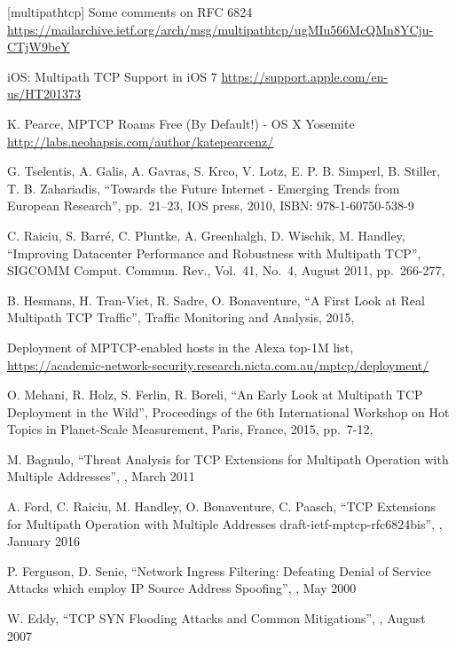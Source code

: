 \begin{thebibliography}{99}
[multipathtcp] Some comments on RFC 6824
\url{https://mailarchive.ietf.org/arch/msg/multipathtcp/ugMIu566McQMn8YCju-CTjW9beY}

iOS: Multipath TCP Support in iOS 7
\url{https://support.apple.com/en-us/HT201373}

K. Pearce, MPTCP Roams Free (By Default!) - OS X Yosemite
\url{http://labs.neohapsis.com/author/katepearcenz/}

G. Tselentis, A. Galis, A. Gavras, S. Krco, V. Lotz, E. P. B. Simperl, B. Stiller, T. B. Zahariadis, 
``Towards the Future Internet - Emerging Trends from European Research'',
pp.\ 21--23,
IOS press, 2010,
ISBN: 978-1-60750-538-9

C. Raiciu, S. Barr{\'e}, C. Pluntke, A. Greenhalgh, D. Wischik, M. Handley,
``Improving Datacenter Performance and Robustness with Multipath TCP'', 
SIGCOMM Comput. Commun. Rev., 
Vol.\ 41, No.\ 4,
August 2011, 
pp.\ 266-277,

B. Hesmans, H. Tran-Viet, R. Sadre, O. Bonaventure, 
``A First Look at Real Multipath TCP Traffic'',
Traffic Monitoring and Analysis,
2015,

Deployment of MPTCP-enabled hosts in the Alexa top-1M list,
\url{https://academic-network-security.research.nicta.com.au/mptcp/deployment/}

O. Mehani, R. Holz, S. Ferlin, R. Boreli,
``An Early Look at Multipath TCP Deployment in the Wild'',
Proceedings of the 6th International Workshop on Hot Topics in Planet-Scale Measurement, 
Paris, France, 2015,
pp.\ 7-12, 

M. Bagnulo,
``Threat Analysis for TCP Extensions for Multipath Operation with Multiple Addresses'',
,  March 2011

A. Ford, C. Raiciu, M. Handley, O. Bonaventure, C. Paasch,
``TCP Extensions for Multipath Operation with Multiple Addresses draft-ietf-mptcp-rfc6824bis'',
,  January 2016

P. Ferguson, D. Senie,
``Network Ingress Filtering: Defeating Denial of Service Attacks which employ IP Source Address Spoofing'',
,  May 2000

W. Eddy,
``TCP SYN Flooding Attacks and Common Mitigations'',
,  August 2007


\end{thebibliography}
